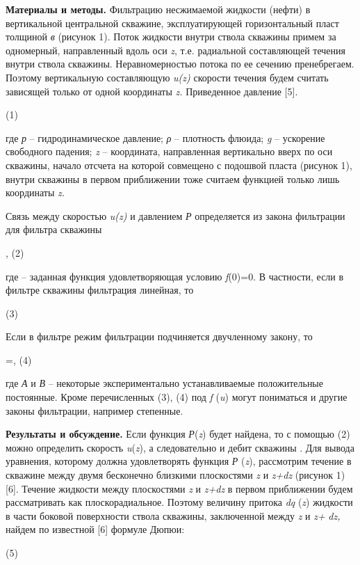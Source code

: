 {\bfseries Материалы и методы.} Фильтрацию несжимаемой жидкости (нефти) в
вертикальной центральной скважине, эксплуатирующей горизонтальный пласт
толщиной \emph{в} (рисунок 1). Поток жидкости внутри ствола скважины
примем за одномерный, направленный вдоль оси \emph{z}, т.е. радиальной
составляющей течения внутри ствола скважины. Неравномерностью потока по
ее сечению пренебрегаем. Поэтому вертикальную составляющую \emph{u(z)}
скорости течения будем считать зависящей только от одной координаты
\emph{z.} Приведенное давление {[}5{]}.

(1)

где \emph{р} -- гидродинамическое давление; \emph{ρ} -- плотность
флюида; \emph{g} -- ускорение свободного падения; \emph{z} --
координата, направленная вертикально вверх по оси скважины, начало
отсчета на которой совмещено с подошвой пласта (рисунок 1), внутри
скважины в первом приближении тоже считаем функцией только лишь
координаты \emph{z.}

Связь между скоростью \emph{u(z)} и давлением \emph{Р} определяется из
закона фильтрации для фильтра скважины

, (2)

где 
-- заданная функция удовлетворяющая условию \emph{f}(0)=0. В частности,
если в фильтре скважины фильтрация линейная, то

(3)

Если в фильтре режим фильтрации подчиняется двучленному закону, то

=,
(4)

где \emph{А} и \emph{В} -- некоторые экспериментально устанавливаемые
положительные постоянные. Кроме перечисленных (3), (4) под \emph{f}
(\emph{u}) могут пониматься и другие законы фильтрации, например
степенные.

{\bfseries Результаты и обсуждение.} Если функция \emph{Р}(\emph{z}) будет
найдена, то с помощью (2) можно определить скорость \emph{u}(\emph{z}),
а следовательно и дебит скважины
. Для
вывода уравнения, которому должна удовлетворять функция \emph{Р}
(\emph{z}), рассмотрим течение в скважине между двумя бесконечно
близкими плоскостями \emph{z} и \emph{z+dz} (рисунок 1) {[}6{]}. Течение
жидкости между плоскостями \emph{z} и \emph{z+dz} в первом приближении
будем рассматривать как плоскорадиальное. Поэтому величину притока
\emph{dq} (\emph{z}) жидкости в части боковой поверхности ствола
скважины, заключенной между \emph{z} и \emph{z+} \emph{dz,} найдем по
известной {[}6{]} формуле Дюпюи:

(5)

